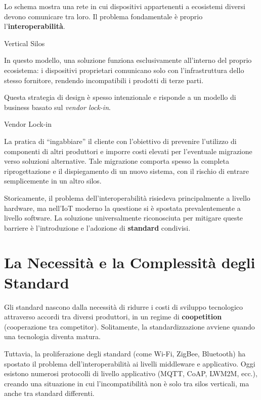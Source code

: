 \documentclass[
  italian,
  openany]{book}
\begin{document}
Lo schema mostra una rete in cui dispositivi appartenenti a ecosistemi
diversi devono comunicare tra loro. Il problema fondamentale è proprio
l'\textbf{interoperabilità}.

\begin{calloutdefinition}{Vertical Silos}

In questo modello, una soluzione funziona esclusivamente all'interno del
proprio ecosistema: i dispositivi proprietari comunicano solo con
l'infrastruttura dello stesso fornitore, rendendo incompatibili i
prodotti di terze parti.

\end{calloutdefinition}

Questa strategia di design è spesso intenzionale e risponde a un modello
di business basato sul \emph{vendor lock-in}.

\begin{calloutdefinition}{Vendor Lock-in}

La pratica di ``ingabbiare'' il cliente con l'obiettivo di prevenire
l'utilizzo di componenti di altri produttori e imporre costi elevati per
l'eventuale migrazione verso soluzioni alternative. Tale migrazione
comporta spesso la completa riprogettazione e il dispiegamento di un
nuovo sistema, con il rischio di entrare semplicemente in un altro
silos.

\end{calloutdefinition}

Storicamente, il problema dell'interoperabilità risiedeva principalmente
a livello hardware, ma nell'IoT moderno la questione si è spostata
prevalentemente a livello software. La soluzione universalmente
riconosciuta per mitigare queste barriere è l'introduzione e l'adozione
di \textbf{standard} condivisi.

\section{La Necessità e la Complessità degli
Standard}\label{la-necessituxe0-e-la-complessituxe0-degli-standard}

Gli standard nascono dalla necessità di ridurre i costi di sviluppo
tecnologico attraverso accordi tra diversi produttori, in un regime di
\textbf{coopetition} (cooperazione tra competitor). Solitamente, la
standardizzazione avviene quando una tecnologia diventa matura.

Tuttavia, la proliferazione degli standard (come Wi-Fi, ZigBee,
Bluetooth) ha spostato il problema dell'interoperabilità ai livelli
middleware e applicativo. Oggi esistono numerosi protocolli di livello
applicativo (MQTT, CoAP, LWM2M, ecc.), creando una situazione in cui
l'incompatibilità non è solo tra silos verticali, ma anche tra standard
differenti.
\end{document}
